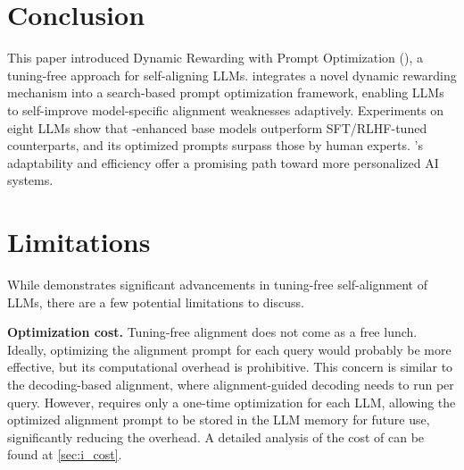 \vspace{-5pt}
\section{Conclusion}
\vspace{-5pt}


This paper introduced Dynamic Rewarding with Prompt Optimization (\ours), a tuning-free approach for self-aligning LLMs. \ours integrates a novel dynamic rewarding mechanism into a search-based prompt optimization framework, enabling LLMs to self-improve model-specific alignment weaknesses adaptively. Experiments on eight LLMs show that \ours-enhanced base models outperform SFT/RLHF-tuned counterparts, and its optimized prompts surpass those by human experts. \ours's adaptability and efficiency offer a promising path toward more personalized AI systems.


\newpage





\section*{Limitations}

While \ours demonstrates significant advancements in tuning-free self-alignment of LLMs, there are a few potential limitations to discuss. 


\noindent \textbf{Optimization cost.}
Tuning-free alignment does not come as a free lunch. Ideally, optimizing the alignment prompt for each query would probably be more effective, but its computational overhead is prohibitive. This concern is similar to the decoding-based alignment, where alignment-guided decoding needs to run per query. However, \ours requires only a one-time optimization for each LLM, allowing the optimized alignment prompt to be stored in the LLM memory for future use, significantly reducing the overhead. A detailed analysis of the cost of \ours can be found at \ref{sec:i_cost}.

